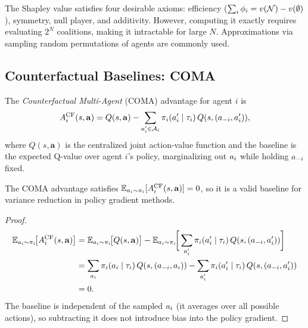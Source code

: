 \documentclass[11pt,a4paper]{article}
\begin{document}
\begin{remark}
The Shapley value satisfies four desirable axioms: efficiency
($\sum_i \phi_i = v(\mathcal{N}) - v(\emptyset)$), symmetry, null
player, and additivity.  However, computing it exactly requires
evaluating $2^N$ coalitions, making it intractable for large $N$.
Approximations via sampling random permutations of agents are
commonly used.
\end{remark}

\subsection{Counterfactual Baselines: COMA}

\begin{definition}
\label{def:coma}
The \emph{Counterfactual Multi-Agent} (COMA) advantage for agent
$i$ is
\begin{equation}
\label{eq:coma}
  A_i^{\mathrm{CF}}(s, \mathbf{a})
  = Q(s, \mathbf{a}) - \sum_{a_i' \in \mathcal{A}_i}
    \pi_i(a_i' \mid \tau_i)\, Q(s, (a_{-i}, a_i')),
\end{equation}
where $Q(s, \mathbf{a})$ is the centralized joint action-value
function and the baseline is the expected Q-value over agent $i$'s
policy, marginalizing out $a_i$ while holding $a_{-i}$ fixed.
\end{definition}

\begin{proposition}
\label{prop:coma-unbiased}
The COMA advantage satisfies
$\mathbb{E}_{a_i \sim \pi_i}[A_i^{\mathrm{CF}}(s, \mathbf{a})]
= 0$, so it is a valid baseline for variance reduction in
policy gradient methods.
\end{proposition}

\begin{proof}
\begin{align*}
  \mathbb{E}_{a_i \sim \pi_i}\!\big[A_i^{\mathrm{CF}}(s, \mathbf{a})\big]
  &= \mathbb{E}_{a_i \sim \pi_i}\!\big[Q(s, \mathbf{a})\big]
     - \mathbb{E}_{a_i \sim \pi_i}\!\bigg[
       \sum_{a_i'} \pi_i(a_i' \mid \tau_i)\, Q(s, (a_{-i}, a_i'))
     \bigg] \\
  &= \sum_{a_i} \pi_i(a_i \mid \tau_i)\,
     Q(s, (a_{-i}, a_i))
     - \sum_{a_i'} \pi_i(a_i' \mid \tau_i)\,
     Q(s, (a_{-i}, a_i')) \\
  &= 0.
\end{align*}
The baseline is independent of the sampled $a_i$ (it
averages over all possible actions), so subtracting it does not
introduce bias into the policy gradient.
\end{proof}
\end{document}

